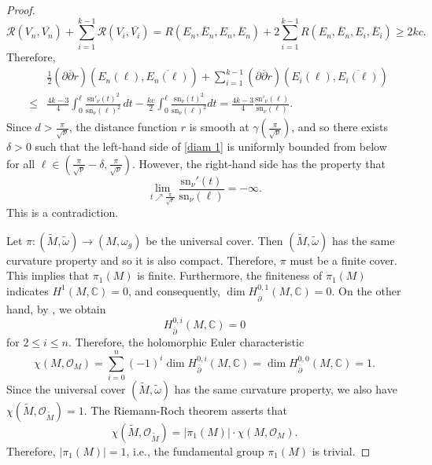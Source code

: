 \documentclass[12pt,reqno]{amsart}
\newcommand\cO{{\mathcal O}}
\newcommand\sR{{\mathcal R}}
\newcommand\bp{{\bar\partial}}
\theoremstyle{plain}
\theoremstyle{definition}
\newcommand{\p}{\partial}
\renewcommand{\bar}{\overline}
\newcommand{\beq}{\begin{equation}}
\newcommand{\eeq}{\end{equation}}
\renewcommand{\tilde}{\widetilde}
\renewcommand{\bp}{\bar{\partial}}
\renewcommand{\>}{\rightarrow}
\newcommand{\C}{{\mathbb C}}
\numberwithin{equation}{section} %
\newcommand{\om}{\omega}
\renewcommand{\leq}{\leqslant}
\renewcommand{\geq}{\geqslant}
\begin{document}
\begin{proof}
    \beq \sR\left(V_n,\bar{V_n}\right)+\sum_{i=1}^{k-1} \sR\left(V_i,\bar{V_i}\right)=
    R\left(E_n,\bar{E}_n,E_n,\bar{E}_n\right) + 2\sum_{i=1}^{k-1} R\left(E_n,\bar{E}_n,E_i,\bar{E}_i\right) \geq 2kc.
    \eeq
    Therefore,
    \begin{eqnarray}
    &&\frac{1}{2} \left(\p\bp r\right)\left(E_n(\ell),\bar{E_n(\ell)}\right) +
    \sum_{i=1}^{k-1} \left(\p\bp r\right)\left(E_i(\ell),\bar{E_i(\ell)}\right) \label{diam 1} \\
    &\leq& \frac{4k-3}{4} \int_0^\ell  \frac{\mathrm{sn}'_{\nu}(t)^2}{\mathrm{sn}_{\nu}(\ell)^2}\,dt -\frac{kc}{2}\int_0^\ell  \frac{\mathrm{sn}_{\nu}(t)^2}{\mathrm{sn}_{\nu}(\ell)^2}  dt
    = \frac{4k-3}{4}\frac{\mathrm{sn}'_{\nu}(\ell)}{\mathrm{sn}_{\nu}(\ell)}.\nonumber
    \end{eqnarray}
    Since $d>\frac{\pi}{\sqrt{\nu}}$, the distance function $r$ is smooth at $\gamma\left(\frac{\pi}{\sqrt{\nu}}\right)$, and so there exists $\delta>0$ such that the left-hand side of \eqref{diam 1} is uniformly bounded from below for all $\ell\in \left(\frac{\pi}{\sqrt{\nu}}-\delta,\frac{\pi}{\sqrt{\nu}}\right)$. However, the right-hand side has the property that
    \beq
    \lim_{t\nearrow \frac{\pi}{\sqrt{\nu}}}\frac{\mathrm{sn}_{\nu}'(t)}{\mathrm{sn}_{\nu}(\ell)}=-\infty.
    \eeq
This is a contradiction.

    Let $\pi:(\tilde M,\tilde \om)\to (M,\om_g)$ be the universal cover. Then $(\tilde M,\tilde \om)$ has the same curvature property and so it is also compact.
Therefore,  $\pi$ must be a finite cover. This implies that $\pi_1(M)$ is finite.
Furthermore, the finiteness of $\pi_1(M)$ indicates $H^1(M, \mathbb{C}) = 0$, and consequently, $\dim H^{0,1}_{\bp}(M,\C)=0.$
On the other hand, by \cite[Theorem~1.5]{WY25+}, we obtain
\beq
H^{0,i}_{\bp}(M,\C)=0
\eeq
for $2\leq i\leq n$. Therefore, the holomorphic Euler characteristic
\beq
\chi(M,\cO_M)
=\sum_{i=0}^n(-1)^i \dim H^{0,i}_{\bp}(M,\C)
= \dim H^{0,0}_{\bp}(M,\C) =1.
\eeq
Since the universal cover $(\tilde M,\tilde \om)$ has the same curvature property, we also have $
\chi\left(\tilde M,\cO_{\tilde M}\right) =1$.
The Riemann-Roch theorem asserts that
\beq
\chi\left(\tilde M,\cO_{\tilde M}\right)
=\left|\pi_1(M)\right|\cdot \chi(M,\cO_M).
\eeq
Therefore, $\left|\pi_1(M)\right|=1$, i.e., the fundamental group $\pi_1(M)$ is trivial.\end{proof}
\end{document}
